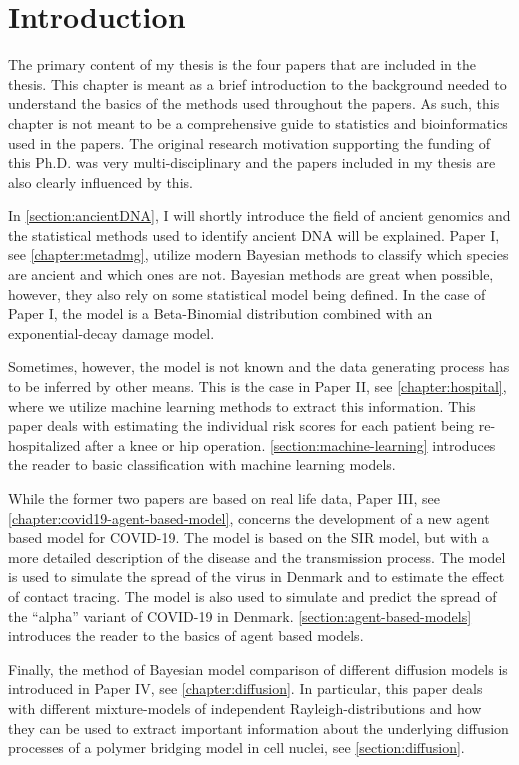 
\chapter{Introduction}
The primary content of my thesis is the four papers that are included in the thesis. This chapter is meant as a brief introduction to the background needed to understand the basics of the methods used throughout the papers. As such, this chapter is not meant to be a comprehensive guide to statistics and bioinformatics used in the papers. The original research motivation supporting the funding of this Ph.D. was very multi-disciplinary and the papers included in my thesis are also clearly influenced by this.

In \autoref{section:ancientDNA}, I will shortly introduce the field of ancient genomics and the statistical methods used to identify ancient DNA will be explained. Paper I, see \autoref{chapter:metadmg}, utilize modern Bayesian methods to classify which species are ancient and which ones are not. Bayesian methods are great when possible, however, they also rely on some statistical model being defined. In the case of Paper I, the model is a Beta-Binomial distribution combined with an exponential-decay damage model.

Sometimes, however, the model is not known and the data generating process has to be inferred by other means. This is the case in Paper II, see \autoref{chapter:hospital}, where we utilize machine learning methods to extract this information. This paper deals with estimating the individual risk scores for each patient being re-hospitalized after a knee or hip operation. \autoref{section:machine-learning} introduces the reader to basic classification with machine learning models.

While the former two papers are based on real life data, Paper III, see \autoref{chapter:covid19-agent-based-model}, concerns the development of a new agent based model for COVID-19. The model is based on the SIR model, but with a more detailed description of the disease and the transmission process. The model is used to simulate the spread of the virus in Denmark and to estimate the effect of contact tracing. The model is also used to simulate and predict the spread of the ``alpha'' variant of COVID-19 in Denmark. \autoref{section:agent-based-models} introduces the reader to the basics of agent based models.

Finally, the method of Bayesian model comparison of different diffusion models is introduced in Paper IV, see \autoref{chapter:diffusion}. In particular, this paper deals with different mixture-models of independent Rayleigh-distributions and how they can be used to extract important information about the underlying diffusion processes of a polymer bridging model in cell nuclei, see \autoref{section:diffusion}.

